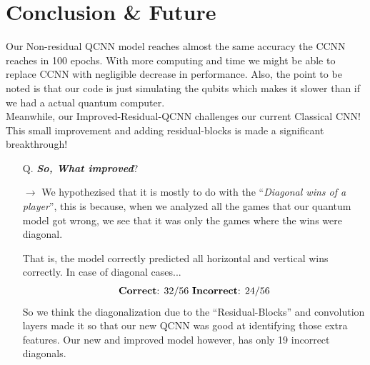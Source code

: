 \documentclass[a4paper]{article}
\begin{document}
\section*{Conclusion \& Future}

Our Non-residual QCNN model reaches almost the same accuracy the CCNN reaches in 100 epochs. With more computing and time we might be able to replace CCNN with negligible decrease in performance. Also, the point to be noted is that our code is just simulating the qubits which makes it slower than if we had a actual quantum computer.\\

Meanwhile, our Improved-Residual-QCNN challenges our current Classical CNN! This small improvement and adding residual-blocks is made a significant breakthrough!

\begin{itemize}
\item[Q.] \textbf{\emph{So, What improved}}?
\item[\textbf{$\rightarrow$}] We hypothezised that it is mostly to do with the ``\emph{Diagonal wins of a player}'', this is because, when we analyzed all the games that our quantum model got wrong, we see that it was only the games where the wins were diagonal.

That is, the model correctly predicted all horizontal and vertical wins correctly. In case of diagonal cases...
\[ \text{\textbf{Correct}: } 32/56 \text{ \textbf{Incorrect}: } 24/56 \]
So we think the diagonalization due to the ``Residual-Blocks'' and convolution layers made it so that our new QCNN was good at identifying those extra features. Our new and improved model however, has only 19 incorrect diagonals.
\end{itemize}
\end{document}
